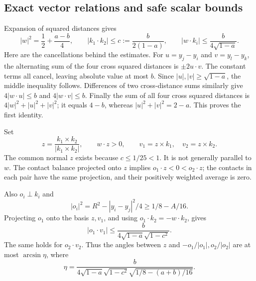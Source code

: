 \documentclass[11pt]{article}
\numberwithin{equation}{section}
\theoremstyle{definition}\newtheorem{definition}[theorem]{Definition}
\theoremstyle{remark}\newtheorem{remark}[theorem]{Remark}
\begin{document}
\subsection{Exact vector relations and safe scalar bounds}
Expansion of squared distances gives
\begin{equation}\label{eq:pairgeometry}
 |w|^2=\frac12+\frac{a-b}{4},\qquad
 |k_1\cdot k_2|\le c:=\frac{b}{2(1-a)},\qquad
 |w\cdot k_i|\le\frac{b}{4\sqrt{1-a}}.
\end{equation}
Here are the cancellations behind the estimates. For $u=y_j-y_i$ and
$v=y_l-y_k$, the alternating sum of the four cross squared distances is
$\pm2u\cdot v$. The constant terms all cancel, leaving absolute value at
most $b$. Since $|u|,|v|\ge\sqrt{1-a}$, the middle inequality follows.
Differences of two cross-distance sums similarly give
$4|w\cdot u|\le b$ and $4|w\cdot v|\le b$. Finally the sum of all four
cross squared distances is
$4|w|^2+|u|^2+|v|^2$; it equals $4-b$, whereas
$|u|^2+|v|^2=2-a$. This proves the first identity.

Set
\[
 z=\frac{k_1\times k_2}{|k_1\times k_2|},\qquad w\cdot z>0,
 \qquad v_1=z\times k_1,\quad v_2=z\times k_2.
\]
The common normal $z$ exists because $c\le1/25<1$. It is not generally
parallel to $w$. The contact balance projected onto $z$ implies
$o_1\cdot z<0<o_2\cdot z$; the contacts in each pair have the same
projection, and their positively weighted average is zero.

Also $o_i\perp k_i$ and
\[
 |o_i|^2=R^2-|y_i-y_j|^2/4\ge1/8-A/16.
\]
Projecting $o_1$ onto the basis $z,v_1$, and using
$o_1\cdot k_2=-w\cdot k_2$, gives
\[
 |o_1\cdot v_1|\le\frac{b}{4\sqrt{1-a}\sqrt{1-c^2}}.
\]
The same holds for $o_2\cdot v_2$. Thus the angles between $z$ and
$-o_1/|o_1|,o_2/|o_2|$ are at most $\arcsin\eta$, where
\begin{equation}\label{eq:eta}
 \eta=\frac{b}{4\sqrt{1-a}\sqrt{1-c^2}\sqrt{1/8-(a+b)/16}}.
\end{equation}
\end{document}
